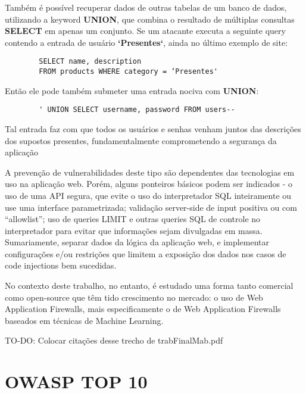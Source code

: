 \begin{alineas}
    \item
    Também é possível recuperar dados de outras tabelas de um banco de dados, utilizando a keyword \textbf{UNION}, que combina o resultado de múltiplas consultas \textbf{SELECT} em apenas um conjunto. Se um atacante executa a seguinte query contendo a entrada de usuário \textbf{`Presentes`}, ainda no último exemplo de site:
    
    \begin{verbatim}
        SELECT name, description
        FROM products WHERE category = ‘Presentes'
    \end{verbatim}
    
    Então ele pode também submeter uma entrada nociva com \textbf{UNION}:
    
    \begin{verbatim}
        ' UNION SELECT username, password FROM users--
    \end{verbatim}
        
    Tal entrada faz com que todos os usuários e senhas venham juntos das descrições dos supostos presentes, fundamentalmente comprometendo a segurança da aplicação

\end{alineas}

A prevenção de vulnerabilidades deste tipo são dependentes das tecnologias em uso na aplicação web. Porém, alguns ponteiros básicos podem ser indicados - o uso de uma API segura, que evite o uso do interpretador SQL inteiramente ou use uma interface parametrizada; validação server-side de input positiva ou com “allowlist”; uso de queries LIMIT e outras queries SQL de controle no interpretador para evitar que informações sejam divulgadas em massa. Sumariamente, separar dados da lógica da aplicação web, e implementar configurações e/ou restrições que limitem a exposição dos dados nos casos de code injections bem sucedidas. 

No contexto deste trabalho, no entanto, é estudado uma forma tanto comercial como open-source que têm tido crescimento no mercado: o uso de Web Application Firewalls, mais especificamente o de Web Application Firewalls baseados em técnicas de Machine Learning.

TO-DO: Colocar citações desse trecho de trabFinalMab.pdf 

\section{OWASP TOP 10}

